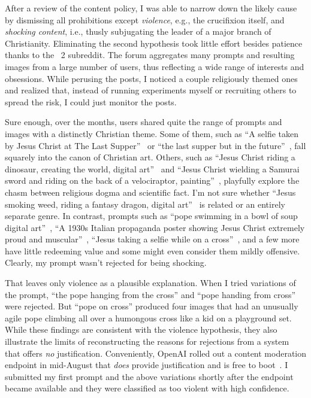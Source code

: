 After a review of the content policy, I was able to narrow down the likely cause
by dismissing all prohibitions except \emph{violence}, e.g., the crucifixion
itself, and \emph{shocking content}, i.e., thusly subjugating the leader of a
major branch of Christianity. Eliminating the second hypothesis took little
effort besides patience thanks to the \DALLE\ 2 subreddit. The forum aggregates
many prompts and resulting images from a large number of users, thus reflecting
a wide range of interests and obsessions. While perusing the posts, I noticed a
couple religiously themed ones and realized that, instead of running experiments
myself or recruiting others to spread the risk, I could just monitor the posts.

Sure enough, over the months, users shared quite the range of prompts and images
with a distinctly Christian theme. Some of them, such as ``A selfie taken by
Jesus Christ at The Last Supper''~\cite{Jolleb2022} or ``the last supper but in
the future''~\cite{FlargenstowTayne2022}, fall squarely into the canon of
Christian art. Others, such as ``Jesus Christ riding a dinosaur, creating the
world, digital art''~\cite{CosasSueltas2022} and ``Jesus Christ wielding a
Samurai sword and riding on the back of a velociraptor,
painting''~\cite{WastedEntity2022}, playfully explore the chasm between
religious dogma and scientific fact. I'm not sure whether ``Jesus smoking weed,
riding a fantasy dragon, digital art''~\cite{Erubisile2022} is related or an
entirely separate genre. In contrast, prompts such as ``pope swimming in a bowl
of soup digital art''~\cite{CatsAndDogs99-2022}, ``A 1930s Italian propaganda
poster showing Jesus Christ extremely proud and
muscular''~\cite{FrontAthlete9824-2022}, ``Jesus taking a selfie while on a
cross''~\cite{TheDrewDude2022}, and a few
more~\cite{Blazedchiller272022,InvisibleDeck2022} have little redeeming value
and some might even consider them mildly offensive. Clearly, my prompt wasn't
rejected for being shocking.

That leaves only violence as a plausible explanation. When I tried variations of
the prompt, ``the pope hanging from the cross'' and ``pope handing from cross''
were rejected. But ``pope on cross'' produced four images that had an unusually
agile pope climbing all over a humongous cross like a kid on a playground set.
While these findings are consistent with the violence hypothesis, they also
illustrate the limits of reconstructing the reasons for rejections from a system
that offers \emph{no} justification. Conveniently, OpenAI rolled out a content
moderation endpoint in mid-August that \emph{does} provide justification and is
free to boot~\cite{OpenAI2022b}. I submitted my first prompt and the above
variations shortly after the endpoint became available and they were classified
as too violent with high confidence.

